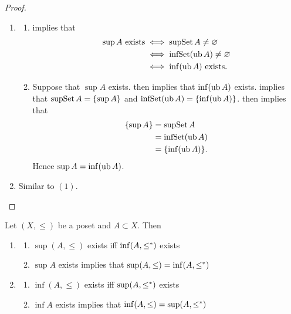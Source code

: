 \documentclass{book}
\begin{document}
	\begin{proof}\
		\begin{enumerate}
			\item 
			\begin{enumerate}
				\item {} implies that 
				\begin{align*}
					\text{$\sup A$ exists} 
					& \iff \operatorname{supSet} A \neq \varnothing \\
					& \iff \operatorname{infSet} (\operatorname{ub} A) \neq \varnothing \\
					& \iff \text{$\inf (\operatorname{ub} A)$ exists} . 
				\end{align*}
				\item Suppose that $\sup A$ exists.  then implies that $\inf (\operatorname{ub} A)$ exists.  implies that $\operatorname{supSet} A = \{\sup A\}$ and $\operatorname{infSet} (\operatorname{ub} A) = \{\inf (\operatorname{ub} A)\}$.  then implies that
				\begin{align*}
					\{\sup A\}
					& = \operatorname{supSet} A \\
					& = \operatorname{infSet} (\operatorname{ub} A) \\
					& = \{\inf (\operatorname{ub} A)\}.
				\end{align*} 
				Hence $\sup A = \inf (\operatorname{ub} A)$.
			\end{enumerate}
			\item Similar to $(1)$.
		\end{enumerate}
	\end{proof}
	
	\begin{ex} 
		Let $(X, \leq)$ be a poset and $A \subset X$. Then 
		\begin{enumerate}
			\item 
			\begin{enumerate}
				\item $\sup (A, \leq)$ exists iff $\inf (A, \leq^*)$ exists
				\item $\sup A$ exists implies that $\sup (A, \leq) = \inf (A, \leq^*)$ 
			\end{enumerate}
			\item 
			\begin{enumerate}
				\item $\inf (A, \leq)$ exists iff $\sup (A, \leq^*)$ exists
				\item $\inf A$ exists implies that $\inf (A, \leq) = \sup (A, \leq^*)$ 
			\end{enumerate}
		\end{enumerate}
	\end{ex}
	
\end{document}
